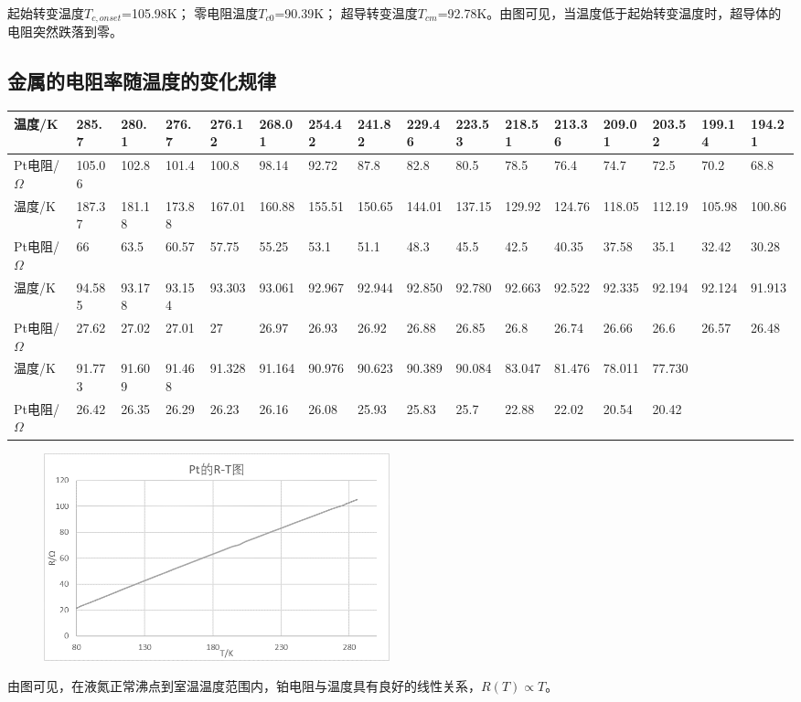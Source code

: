 \documentclass[UTF8]{ctexart}
\begin{document}
起始转变温度$T_{c,onset}$=105.98K；
零电阻温度$T_{c0}$=90.39K；
超导转变温度$T_{cm}$=92.78K。由图可见，当温度低于起始转变温度时，超导体的电阻突然跌落到零。

\subsection{金属的电阻率随温度的变化规律}
\begin{table}[H]
\tiny
\centering
\begin{tabular}{|l|l|l|l|l|l|l|l|l|l|l|l|l|l|l|l|}
\hline
温度/K         & 285.7  & 280.1  & 276.7  & 276.12 & 268.01 & 254.42 & 241.82 & 229.46 & 223.53 & 218.51 & 213.36 & 209.01 & 203.52 & 199.14 & 194.21 \\ \hline
Pt电阻/$\Omega$ & 105.06 & 102.8  & 101.4  & 100.8  & 98.14  & 92.72  & 87.8   & 82.8   & 80.5   & 78.5   & 76.4   & 74.7   & 72.5   & 70.2   & 68.8   \\ \hline
温度/K         & 187.37 & 181.18 & 173.88 & 167.01 & 160.88 & 155.51 & 150.65 & 144.01 & 137.15 & 129.92 & 124.76 & 118.05 & 112.19 & 105.98 & 100.86 \\ \hline
Pt电阻/$\Omega$ & 66     & 63.5   & 60.57  & 57.75  & 55.25  & 53.1   & 51.1   & 48.3   & 45.5   & 42.5   & 40.35  & 37.58  & 35.1   & 32.42  & 30.28  \\ \hline
温度/K         & 94.585 & 93.178 & 93.154 & 93.303 & 93.061 & 92.967 & 92.944 & 92.850 & 92.780 & 92.663 & 92.522 & 92.335 & 92.194 & 92.124 & 91.913 \\ \hline
Pt电阻/$\Omega$ & 27.62  & 27.02  & 27.01  & 27     & 26.97  & 26.93  & 26.92  & 26.88  & 26.85  & 26.8   & 26.74  & 26.66  & 26.6   & 26.57  & 26.48  \\ \hline
温度/K         & 91.773 & 91.609 & 91.468 & 91.328 & 91.164 & 90.976 & 90.623 & 90.389 & 90.084 & 83.047 & 81.476 & 78.011 & 77.730 &        &        \\ \hline
Pt电阻/$\Omega$ & 26.42  & 26.35  & 26.29  & 26.23  & 26.16  & 26.08  & 25.93  & 25.83  & 25.7   & 22.88  & 22.02  & 20.54  & 20.42  &        &        \\ \hline
\end{tabular}
\end{table}
\begin{figure}[H]
\centering
\includegraphics[width=10cm]{pic2.png}
\end{figure}
由图可见，在液氮正常沸点到室温温度范围内，铂电阻与温度具有良好的线性关系，$R(T)\propto T$。
\end{document}
